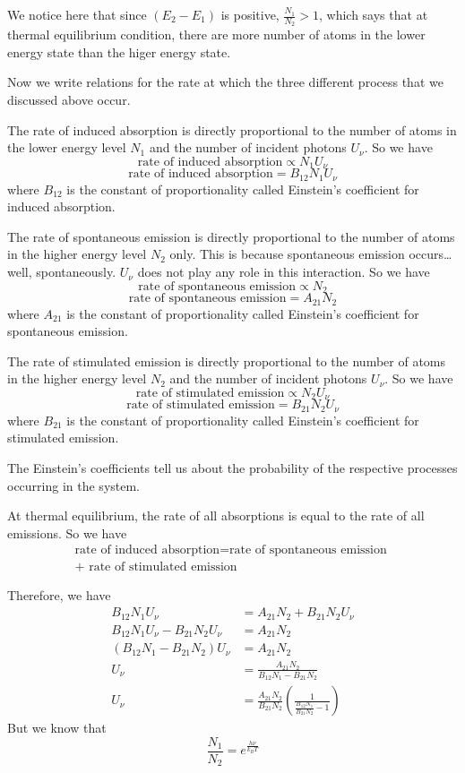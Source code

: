 \documentclass[12pt]{article}
\begin{document}
We notice here that since \((E_2-E_1)\) is positive, \(\frac{N_1}{N_2}>1\), which says that at thermal equilibrium condition, there are more number of atoms in the lower energy state than the higer energy state.

Now we write relations for the rate at which the three different process that we discussed above occur.

The rate of induced absorption is directly proportional to the number of atoms in the lower energy level \(N_1\) and the number of incident photons \(U_\nu\). So we have
\[\text{rate of induced absorption}\propto N_1 U_\nu\]
\[\text{rate of induced absorption}= B_{12} N_1 U_\nu\]
where \(B_{12}\) is the constant of proportionality called Einstein's coefficient for induced absorption.

The rate of spontaneous emission is directly proportional to the number of atoms in the higher energy level \(N_2\) only. This is because spontaneous emission occurs… well, spontaneously. \(U_\nu\) does not play any role in this interaction. So we have
\[\text{rate of spontaneous emission}\propto N_2\]
\[\text{rate of spontaneous emission}= A_{21} N_2\]
where \(A_{21}\) is the constant of proportionality called Einstein's coefficient for spontaneous emission.

The rate of stimulated emission is directly proportional to the number of atoms in the higher energy level \(N_2\) and the number of incident photons \(U_\nu\). So we have
\[\text{rate of stimulated emission}\propto N_2 U_\nu\]
\[\text{rate of stimulated emission}= B_{21} N_2 U_\nu\]
where \(B_{21}\) is the constant of proportionality called Einstein's coefficient for stimulated emission.

The Einstein's coefficients tell us about the probability of the respective processes occurring in the system.

At thermal equilibrium, the rate of all absorptions is equal to the rate of all emissions. So we have
\begin{multline*}
    \text{rate of induced absorption} = \text{rate of spontaneous emission }\\ + \text{ rate of stimulated emission}
\end{multline*}

Therefore, we have
\begin{align*}
    B_{12} N_1 U_\nu &= A_{21} N_2 + B_{21} N_2 U_\nu\\
    B_{12} N_1 U_\nu - B_{21} N_2 U_\nu &= A_{21} N_2\\
    (B_{12} N_1 - B_{21} N_2)U_\nu &= A_{21} N_2\\
    U_\nu &= \frac{A_{21} N_2}{B_{12} N_1 - B_{21} N_2}\\
    U_\nu &= \frac{A_{21} N_2}{B_{21} N_2} \left(\frac{1}{\frac{B_{12} N_1}{B_{21} N_2}-1}\right)
\end{align*}
But we know that
\[\frac{N_1}{N_2}=e^{\frac{h\nu}{k_BT}}\]
\end{document}
